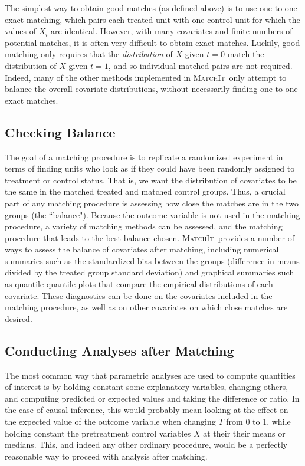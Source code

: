 \documentclass[oneside,letterpaper,titlepage]{article}
\newcommand{\MatchIt}{\textsc{MatchIt}}
\begin{document}
The simplest way to obtain good matches (as defined above) is to use one-to-one exact matching,
which pairs each treated unit with one control unit for which the
values of $X_i$ are identical.  However, with many covariates and finite numbers of
potential matches, it is often very difficult to obtain exact matches.  Luckily, good matching only requires that
the \emph{distribution} of $X$ given $t=0$ match the distribution of
$X$ given $t=1$, and so individual matched pairs are not required.
Indeed, many of the other methods implemented in \MatchIt\ only
attempt to balance the overall covariate distributions, without necessarily finding one-to-one exact matches.

\subsection{Checking Balance}

The goal of a matching procedure is to replicate a randomized experiment in terms of finding units who look
as if they could have been randomly assigned to treatment or control status.  That is, we want the distribution
of covariates to be the same in the matched treated and matched control groups. Thus, a crucial part of any 
matching procedure is assessing how close the matches are in the two groups (the ``balance").  Because the outcome variable
is not used in the matching procedure, a variety of matching methods can be assessed, and the matching procedure that leads to the
best balance chosen.  \MatchIt\ provides a number of ways to assess the balance of covariates after matching, including
numerical summaries such as the standardized bias between the groups (difference in means divided by the treated group standard
deviation) and graphical summaries such as quantile-quantile plots that compare the empirical distributions of each covariate.  
These diagnostics can be done on the covariates included in the matching procedure, as well as on other covariates on which
close matches are desired.  

\subsection{Conducting Analyses after Matching}

The most common way that parametric analyses are used to compute
quantities of interest is by holding constant some explanatory
variables, changing others, and computing predicted or expected values
and taking the difference or ratio.  In the case of causal inference,
this would probably mean looking at the effect on the expected value
of the outcome variable when changing $T$ from 0 to 1, while holding
constant the pretreatment control variables $X$ at their their means
or medians.  This, and indeed any other ordinary procedure, would be a
perfectly reasonable way to proceed with analysis after matching.
\end{document}
